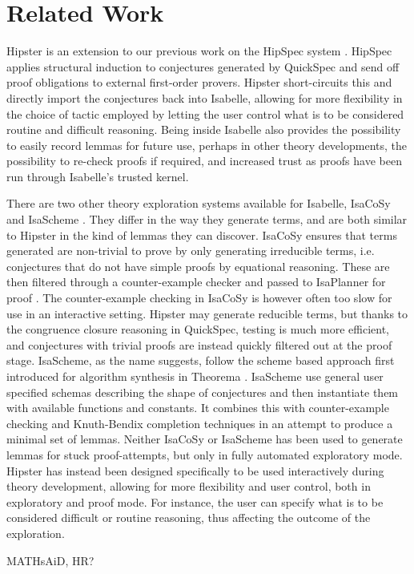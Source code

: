 \section{Related Work}
\label{sec:related}


Hipster is an extension to our previous work on the HipSpec system \cite{hipspecCADE}. HipSpec applies structural induction to conjectures generated by QuickSpec and send off proof obligations to external first-order provers. Hipster short-circuits this and directly import the conjectures back into Isabelle, allowing for more flexibility in the choice of tactic employed by letting the user control what is to be considered routine and difficult reasoning. Being inside Isabelle also provides the possibility to easily record lemmas for future use, perhaps in other theory developments,  the possibility to re-check proofs if required, and increased trust as proofs have been run through Isabelle's trusted kernel. 

There are two other theory exploration systems available for Isabelle, IsaCoSy \cite{isacosy} and IsaScheme \cite{isascheme}. They differ in the way they generate terms, and are both similar to Hipster in the kind of lemmas they can discover. 
IsaCoSy ensures that terms generated are non-trivial to prove by only generating irreducible terms, i.e. conjectures that do not have simple proofs by equational reasoning. These are then filtered through a counter-example checker and passed to IsaPlanner for proof \cite{isaplanner}. The counter-example checking in IsaCoSy is however often too slow for use in an interactive setting. Hipster may generate reducible terms, but thanks to the congruence closure reasoning in QuickSpec, testing is much more efficient, and conjectures with trivial proofs are instead quickly filtered out at the proof stage. 
IsaScheme, as the name suggests, follow the scheme based approach first introduced for algorithm synthesis in Theorema \cite{theorema}. IsaScheme use general user specified schemas describing the shape of conjectures and then instantiate them with available functions and constants. It combines this with counter-example checking and Knuth-Bendix completion techniques in an attempt to produce a minimal set of lemmas. Neither IsaCoSy or IsaScheme has been used to generate lemmas for stuck proof-attempts, but only in fully automated exploratory mode. Hipster has instead been designed specifically to be used interactively during theory development, allowing for more flexibility and user control, both in exploratory and proof mode. For instance, the user can specify what is to be considered difficult or routine reasoning, thus affecting the outcome of the exploration.  

MATHsAiD, HR?


